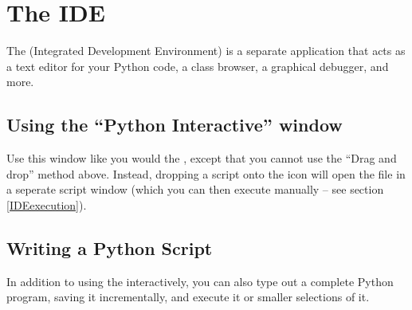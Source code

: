 



\section{The IDE\label{IDE}}

The  (Integrated Development Environment) is a
separate application that acts as a text editor for your Python code,
a class browser, a graphical debugger, and more.


\subsection{Using the ``Python Interactive'' window}

Use this window like you would the , except
that you cannot use the ``Drag and drop'' method above. Instead,
dropping a script onto the  icon will open the
file in a seperate script window (which you can then execute manually
-- see section \ref{IDEexecution}).


\subsection{Writing a Python Script \label{IDEwrite}}

In addition to using the  interactively, you can
also type out a complete Python program, saving it incrementally, and
execute it or smaller selections of it.

